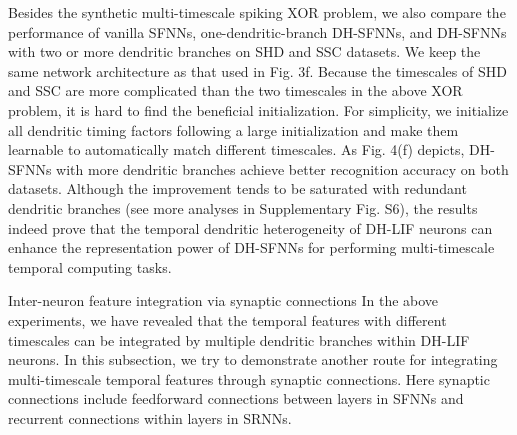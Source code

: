 Besides the synthetic multi-timescale spiking XOR problem, we also compare the performance of vanilla SFNNs, one-dendritic-branch DH-SFNNs, and DH-SFNNs with two or more dendritic branches on SHD and SSC datasets. We keep the same network architecture as that used in Fig. 3f. Because the timescales of SHD and SSC are more complicated than the two timescales in the above XOR problem, it is hard to find the beneficial initialization. For simplicity, we initialize all dendritic timing factors following a large initialization and make them learnable to automatically match different timescales. As Fig. 4(f) depicts, DH-SFNNs with more dendritic branches achieve better recognition accuracy on both datasets. Although the improvement tends to be saturated with redundant dendritic branches (see more analyses in Supplementary Fig. S6), the results indeed prove that the temporal dendritic heterogeneity of DH-LIF neurons can enhance the representation power of DH-SFNNs for performing multi-timescale temporal computing tasks.

Inter-neuron feature integration via synaptic connections
In the above experiments, we have revealed that the temporal features with different timescales can be integrated by multiple dendritic branches within DH-LIF neurons. In this subsection, we try to demonstrate another route for integrating multi-timescale temporal features through synaptic connections. Here synaptic connections include feedforward connections between layers in SFNNs and recurrent connections within layers in SRNNs.

